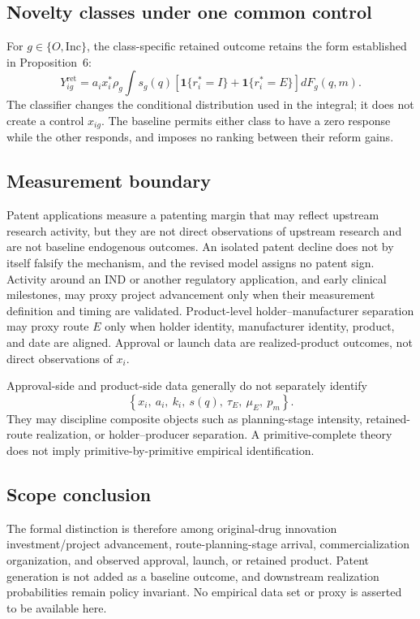 \subsection{Novelty classes under one common control}
\label{subsec:p09-types}

For \(g\in\{O,\mathrm{Inc}\}\), the class-specific retained outcome retains
the form established in Proposition~6:
\begin{equation}
  Y_{ig}^{\mathrm{ret}}
  =
  a_ix_i^*\rho_g
  \int
  s_g(q)
  \left[
    \mathbf 1\{r_i^*=I\}
    +
    \mathbf 1\{r_i^*=E\}
  \right]
  dF_g(q,m).
  \label{eq:p09-type-mixture}
\end{equation}
The classifier changes the conditional distribution used in the integral; it
does not create a control \(x_{ig}\). The baseline permits either class to
have a zero response while the other responds, and imposes no ranking between
their reform gains.

\subsection{Measurement boundary}
\label{subsec:p09-measurement}

Patent applications measure a patenting margin that may reflect upstream
research activity, but they are not direct observations of upstream research
and are not baseline endogenous outcomes. An isolated patent decline does not
by itself falsify the mechanism, and the revised model assigns no patent sign.
Activity around an IND or another regulatory application, and early clinical
milestones, may proxy project advancement only when their measurement definition and
timing are validated.
Product-level holder--manufacturer separation may proxy route \(E\) only when
holder identity, manufacturer identity, product, and date are aligned.
Approval or launch data are realized-product outcomes, not direct observations
of \(x_i\).

Approval-side and product-side data generally do not separately identify
\begin{equation}
  \left\{
    x_i,\ a_i,\ k_i,\ s(q),\ \tau_E,\ \mu_E,\ p_m
  \right\}.
  \label{eq:p09-identification-boundary}
\end{equation}
They may discipline composite objects such as planning-stage intensity,
retained-route realization, or holder--producer separation. A
primitive-complete theory does not imply primitive-by-primitive empirical
identification.

\subsection{Scope conclusion}
\label{subsec:p09-scope}

The formal distinction is therefore among original-drug innovation
investment/project advancement, route-planning-stage arrival,
commercialization organization, and observed approval, launch, or retained
product. Patent generation is not added as a baseline outcome, and downstream
realization probabilities remain policy invariant. No empirical data set or
proxy is asserted to be available here.
